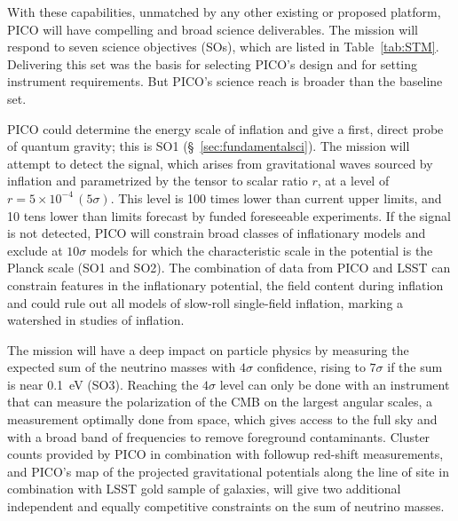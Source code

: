 \documentclass[PICOReport.tex]{subfiles}
\begin{document}
With these capabilities, unmatched by any other existing or proposed platform, PICO will have compelling and broad science deliverables. The mission will respond to seven science objectives (SOs), which are listed in Table~\ref{tab:STM}. Delivering this set was the basis for selecting PICO's design and for setting instrument requirements. But PICO's science reach is broader than the baseline set. 

PICO could determine the energy scale of inflation and give a first, direct probe of quantum gravity; this is SO1 (\S~\ref{sec:fundamentalsci}). The mission will attempt to detect the signal, which arises from gravitational waves sourced by inflation and parametrized by the tensor to scalar ratio $r$, at a level of $r =5\times10^{-4} \, (5\sigma)$. This level is 100 times lower than current upper limits, and 10 tens lower than limits forecast by funded foreseeable experiments.  If the signal is not detected, PICO will constrain broad classes of inflationary models and exclude at $10\sigma$ models for which the characteristic scale in the potential is the Planck scale (SO1 and SO2). The combination of data from PICO and LSST can constrain features in the inflationary potential, the field content during inflation and could rule out all models of slow-roll single-field inflation, marking a watershed in studies of inflation. 

The mission will have a deep impact on particle physics by measuring the expected sum of the neutrino masses with $4\sigma$ confidence, rising to $7\sigma$ if the sum is near 0.1~eV (SO3). Reaching the $4\sigma$ level can only be done with an instrument that can measure the polarization of the CMB on the largest angular scales, a measurement optimally done from space, which gives access to the full sky and with a broad band of frequencies to remove foreground contaminants.  
Cluster counts provided by PICO in combination with followup red-shift measurements, and PICO's map of the projected gravitational potentials along the line of site in combination with LSST gold sample of galaxies, will give two additional independent and equally competitive constraints on the sum of neutrino masses. 
\end{document}
